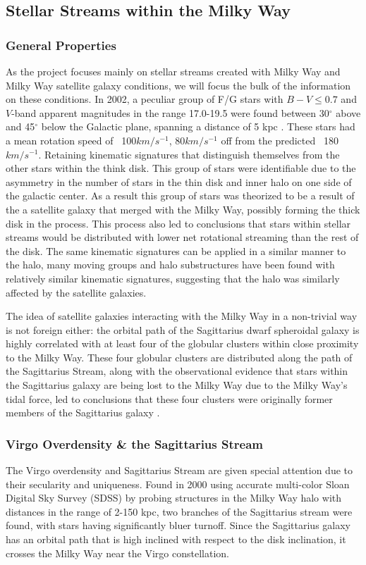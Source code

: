 \documentclass{article}
\begin{document}
\subsection{Stellar Streams within the Milky Way} 
\subsubsection{General Properties} \indent As the project focuses mainly on stellar streams created with Milky Way and Milky Way satellite galaxy conditions, we will focus the bulk of the information on these conditions. In 2002, a peculiar group of F/G stars with $B-V \leq 0.7$ and $V$-band apparent magnitudes in the range 17.0-19.5 were found between 30$^\circ$ above and 45$^\circ$ below the Galactic plane, spanning a distance of 5 kpc \cite{lastMajorInvasion}. These stars had a mean rotation speed of ~100$km/s^{-1}$, 80$km/s^{-1}$ off from the predicted ~180$km/s^{-1}$. Retaining kinematic signatures that distinguish themselves from the other stars within the think disk. This group of stars were identifiable due to the asymmetry in the number of stars in the thin disk and inner halo on one side of the galactic center. As a result this group of stars was theorized to be a result of the a satellite galaxy that merged with the Milky Way, possibly forming the thick disk in the process. This process also led to conclusions that stars within stellar streams would be distributed with lower net rotational streaming than the rest of the disk. The same kinematic signatures can be applied in a similar manner to the halo, many moving groups and halo substructures have been found with relatively similar kinematic signatures, suggesting that the halo was similarly affected by the satellite galaxies. 

\indent The idea of satellite galaxies interacting with the Milky Way in a non-trivial way is not foreign either: the orbital path of the Sagittarius dwarf spheroidal galaxy is highly correlated with at least four of the globular clusters within close proximity to the Milky Way. These four globular clusters are distributed along the path of the Sagittarius Stream, along with the observational evidence that stars within the Sagittarius galaxy are being lost to the Milky Way due to the Milky Way's tidal force, led to conclusions that these four clusters were originally former members of the Sagittarius galaxy \cite{globlarClusters}.

\subsubsection{Virgo Overdensity \& the Sagittarius Stream} \indent The Virgo overdensity and Sagittarius Stream are given special attention due to their secularity and uniqueness. Found in 2000 \cite{ghostOfSagittarius} using accurate multi-color Sloan Digital Sky Survey (SDSS) by probing structures in the Milky Way halo with distances in the range of 2-150 kpc, two branches of the Sagittarius stream were found, with stars having significantly bluer turnoff. Since the Sagittarius galaxy has an orbital path that is high inclined with respect to the disk inclination, it crosses the Milky Way near the Virgo constellation. 
\end{document}
